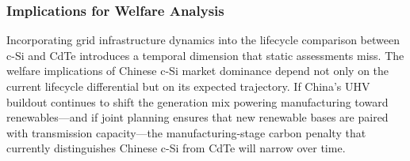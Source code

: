 \documentclass{article}
\begin{document}
 
 
 
\subsubsection{Implications for Welfare Analysis}
 
Incorporating grid infrastructure dynamics into the lifecycle comparison between c-Si and CdTe introduces a temporal dimension that static assessments miss. The welfare implications of Chinese c-Si market dominance depend not only on the current lifecycle differential but on its expected trajectory. If China's UHV buildout continues to shift the generation mix powering manufacturing toward renewables---and if joint planning ensures that new renewable bases are paired with transmission capacity---the manufacturing-stage carbon penalty that currently distinguishes Chinese c-Si from CdTe will narrow over time.
 
\end{document}
